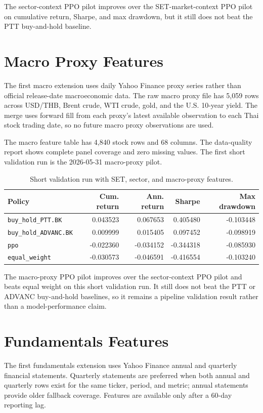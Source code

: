 \documentclass[11pt]{article}
\begin{document}
The sector-context PPO pilot improves over the SET-market-context PPO pilot on cumulative return, Sharpe, and max drawdown, but it still does not beat the PTT buy-and-hold baseline.

\section{Macro Proxy Features}
The first macro extension uses daily Yahoo Finance proxy series rather than official release-date macroeconomic data. The raw macro proxy file has 5,059 rows across USD/THB, Brent crude, WTI crude, gold, and the U.S. 10-year yield. The merge uses forward fill from each proxy's latest available observation to each Thai stock trading date, so no future macro proxy observations are used.

The macro feature table has 4,840 stock rows and 68 columns. The data-quality report shows complete panel coverage and zero missing values. The first short validation run is the 2026-05-31 macro-proxy pilot.

\begin{table}[h]
\centering
\caption{Short validation run with SET, sector, and macro-proxy features.}
\label{tab:macro-context}
\begin{tabular}{lrrrr}
\toprule
Policy & Cum. return & Ann. return & Sharpe & Max drawdown \\
\midrule
\texttt{buy\_hold\_PTT.BK} & 0.043523 & 0.067653 & 0.405480 & -0.103448 \\
\texttt{buy\_hold\_ADVANC.BK} & 0.009999 & 0.015405 & 0.097452 & -0.098919 \\
\texttt{ppo} & -0.022360 & -0.034152 & -0.344318 & -0.085930 \\
\texttt{equal\_weight} & -0.030573 & -0.046591 & -0.416554 & -0.103240 \\
\bottomrule
\end{tabular}
\end{table}

The macro-proxy PPO pilot improves over the sector-context PPO pilot and beats equal weight on this short validation run. It still does not beat the PTT or ADVANC buy-and-hold baselines, so it remains a pipeline validation result rather than a model-performance claim.

\section{Fundamentals Features}
The first fundamentals extension uses Yahoo Finance annual and quarterly financial statements. Quarterly statements are preferred when both annual and quarterly rows exist for the same ticker, period, and metric; annual statements provide older fallback coverage. Features are available only after a 60-day reporting lag.
\end{document}
